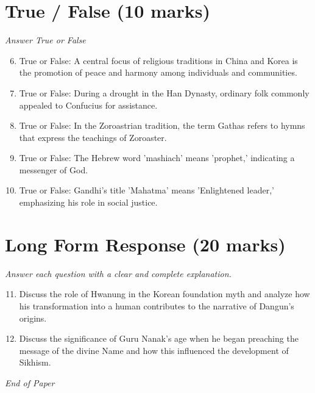 \documentclass[12pt]{article}
\begin{document}
\section*{True / False (10 marks)}
\textit{Answer True or False}
\begin{enumerate}[label=\arabic*.]
\setcounter{enumi}{5}
\item True or False: A central focus of religious traditions in China and Korea is the promotion of peace and harmony among individuals and communities.
\item True or False: During a drought in the Han Dynasty, ordinary folk commonly appealed to Confucius for assistance.
\item True or False: In the Zoroastrian tradition, the term Gathas refers to hymns that express the teachings of Zoroaster.
\item True or False: The Hebrew word 'mashiach' means 'prophet,' indicating a messenger of God.
\item True or False: Gandhi's title 'Mahatma' means 'Enlightened leader,' emphasizing his role in social justice.
\end{enumerate}

\section*{Long Form Response (20 marks)}
\textit{Answer each question with a clear and complete explanation.}
\begin{enumerate}[label=\arabic*.]
\setcounter{enumi}{10}
\item Discuss the role of Hwanung in the Korean foundation myth and analyze how his transformation into a human contributes to the narrative of Dangun's origins.
\item Discuss the significance of Guru Nanak's age when he began preaching the message of the divine Name and how this influenced the development of Sikhism.
\end{enumerate}

\vfill
\noindent\textit{End of Paper}
\end{document}

